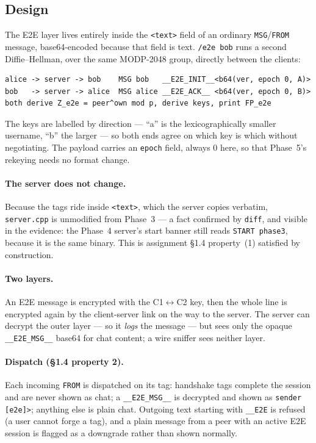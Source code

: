 \documentclass[11pt,a4paper]{article}
\begin{document}
\subsection{Design}

The E2E layer lives entirely inside the \texttt{<text>} field of an ordinary \texttt{MSG}/\texttt{FROM}
message, base64-encoded because that field is text. \texttt{/e2e bob} runs a second Diffie--Hellman,
over the same MODP-2048 group, directly between the clients:

\begin{lstlisting}
alice -> server -> bob    MSG bob   __E2E_INIT__<b64(ver, epoch 0, A)>
bob   -> server -> alice  MSG alice __E2E_ACK__ <b64(ver, epoch 0, B)>
both derive Z_e2e = peer^own mod p, derive keys, print FP_e2e
\end{lstlisting}

The keys are labelled by direction --- ``a'' is the lexicographically smaller username, ``b'' the
larger --- so both ends agree on which key is which without negotiating. The payload carries an
\texttt{epoch} field, always 0 here, so that Phase~5's rekeying needs no format change.

\paragraph{The server does not change.} Because the tags ride inside \texttt{<text>}, which the server
copies verbatim, \texttt{server.cpp} is unmodified from Phase~3 --- a fact confirmed by
\texttt{diff}, and visible in the evidence: the Phase~4 server's start banner still reads
\texttt{START phase3}, because it is the same binary. This is assignment \S1.4 property~(1) satisfied by
construction.

\paragraph{Two layers.} An E2E message is encrypted with the C1$\leftrightarrow$C2 key, then the whole
line is encrypted again by the client-server link on the way to the server. The server can decrypt the
outer layer --- so it \emph{logs} the message --- but sees only the opaque \texttt{\_\_E2E\_MSG\_\_}
base64 for chat content; a wire sniffer sees neither layer.

\paragraph{Dispatch (\S1.4 property 2).} Each incoming \texttt{FROM} is dispatched on its tag: handshake
tags complete the session and are never shown as chat; a \texttt{\_\_E2E\_MSG\_\_} is decrypted and
shown as \texttt{sender [e2e]>}; anything else is plain chat. Outgoing text starting with
\texttt{\_\_E2E} is refused (a user cannot forge a tag), and a plain message from a peer with an active
E2E session is flagged as a downgrade rather than shown normally.
\end{document}
